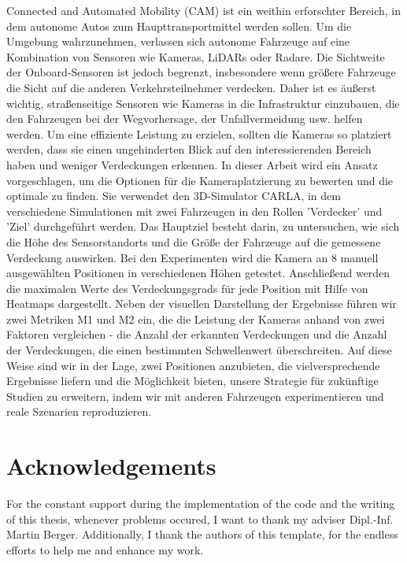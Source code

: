 Connected and Automated Mobility (CAM) ist ein weithin erforschter Bereich, in dem autonome Autos zum Haupttransportmittel werden sollen. Um die Umgebung wahrzunehmen, verlassen sich autonome Fahrzeuge auf eine Kombination von Sensoren wie Kameras, LiDARs oder Radare. Die Sichtweite der Onboard-Sensoren ist jedoch begrenzt, insbesondere wenn größere Fahrzeuge die Sicht auf die anderen Verkehrsteilnehmer verdecken. Daher ist es äußerst wichtig, straßenseitige Sensoren wie Kameras in die Infrastruktur einzubauen, die den Fahrzeugen bei der Wegvorhersage, der Unfallvermeidung usw. helfen werden. Um eine effiziente Leistung zu erzielen, sollten die Kameras so platziert werden, dass sie einen ungehinderten Blick auf den interessierenden Bereich haben und weniger Verdeckungen erkennen. In dieser Arbeit wird ein Ansatz vorgeschlagen, um die Optionen für die Kameraplatzierung zu bewerten und die optimale zu finden. Sie verwendet den 3D-Simulator CARLA, in dem verschiedene Simulationen mit zwei Fahrzeugen in den Rollen 'Verdecker' und 'Ziel' durchgeführt werden. Das Hauptziel besteht darin, zu untersuchen, wie sich die Höhe des Sensorstandorts und die Größe der Fahrzeuge auf die gemessene Verdeckung auswirken. Bei den Experimenten wird die Kamera an 8 manuell ausgewählten Positionen in verschiedenen Höhen getestet. Anschließend werden die maximalen Werte des Verdeckungsgrads für jede Position mit Hilfe von Heatmaps dargestellt. Neben der visuellen Darstellung der Ergebnisse führen wir zwei Metriken M1 und M2 ein, die die Leistung der Kameras anhand von zwei Faktoren vergleichen - die Anzahl der erkannten Verdeckungen und die Anzahl der Verdeckungen, die einen bestimmten Schwellenwert überschreiten. Auf diese Weise sind wir in der Lage, zwei Positionen anzubieten, die vielversprechende Ergebnisse liefern und die Möglichkeit bieten, unsere Strategie für zukünftige Studien zu erweitern, indem wir mit anderen Fahrzeugen experimentieren und reale Szenarien reproduzieren.

\newpage
\chapter*{Acknowledgements}
For the constant support during the implementation of the code and the writing of this thesis, whenever problems occured, I want to thank my adviser Dipl.-Inf. Martin Berger. Additionally, I thank the authors of this template, for the endless efforts to help me and enhance my work.
